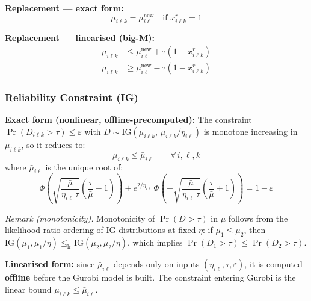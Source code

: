 \documentclass[11pt,a4paper]{article}
\begin{document}
\textbf{Replacement --- exact form:}
\begin{equation}
  \mu_{i\ell k} = \mu^{\mathrm{new}}_{i\ell} \quad \text{if } x^r_{i\ell k} = 1
\end{equation}

\textbf{Replacement --- linearised (big-M):}
\begin{align}
  \mu_{i\ell k} &\leq \mu^{\mathrm{new}}_{i\ell} + \tau(1-x^r_{i\ell k}) \\
  \mu_{i\ell k} &\geq \mu^{\mathrm{new}}_{i\ell} - \tau(1-x^r_{i\ell k})
\end{align}

\subsubsection{Reliability Constraint (IG)}

\textbf{Exact form (nonlinear, offline-precomputed):}
The constraint $\Pr(D_{i\ell k} > \tau) \leq \varepsilon$ with
$D \sim \mathrm{IG}(\mu_{i\ell k},\,\mu_{i\ell k}/\eta_{i\ell})$
is monotone increasing in $\mu_{i\ell k}$, so it reduces to:
\begin{equation}
  \mu_{i\ell k} \leq \bar{\mu}_{i\ell} \qquad \forall\, i,\ell,k
\end{equation}
where $\bar{\mu}_{i\ell}$ is the unique root of:
\begin{equation}
  \Phi\!\left(\sqrt{\frac{\bar\mu}{\eta_{i\ell}\,\tau}}
    \left(\frac{\tau}{\bar\mu} - 1\right)\right)
  + e^{2/\eta_{i\ell}}\,
  \Phi\!\left(-\sqrt{\frac{\bar\mu}{\eta_{i\ell}\,\tau}}
    \left(\frac{\tau}{\bar\mu} + 1\right)\right)
  = 1 - \varepsilon
  \label{eq:ig_mubar}
\end{equation}

\emph{Remark (monotonicity).}
Monotonicity of $\Pr(D > \tau)$ in $\mu$ follows from the likelihood-ratio ordering
of IG distributions at fixed $\eta$: if $\mu_1 \leq \mu_2$, then
$\mathrm{IG}(\mu_1, \mu_1/\eta) \leq_{\mathrm{lr}} \mathrm{IG}(\mu_2, \mu_2/\eta)$,
which implies $\Pr(D_1 > \tau) \leq \Pr(D_2 > \tau)$.

\textbf{Linearised form:} since $\bar{\mu}_{i\ell}$ depends only on inputs
$(\eta_{i\ell}, \tau, \varepsilon)$, it is computed \textbf{offline} before the Gurobi
model is built. The constraint entering Gurobi is the linear bound
$\mu_{i\ell k} \leq \bar{\mu}_{i\ell}$.
\end{document}
